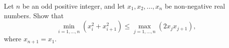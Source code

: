 Let $n$ be an odd positive integer, and let $x_1,x_2,\ldots,x_n$ be non-negative real numbers. Show that \[\min_{i=1,\ldots,n}\left(x_i^2+x_{i+1}^2\right)\leq\max_{j=1,\ldots,n}\left(2x_jx_{j+1}\right),\] where $x_{n+1}=x_1$.